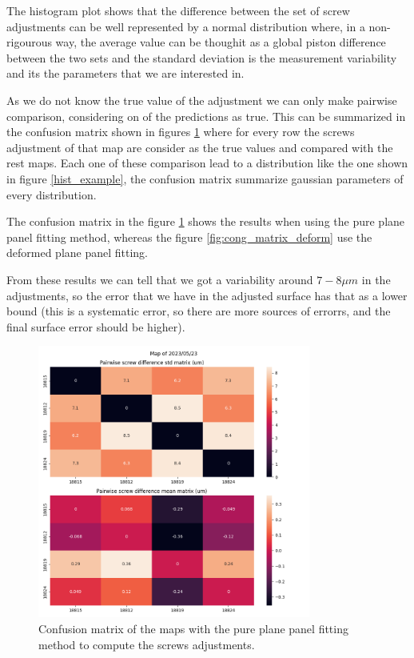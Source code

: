 The histogram plot shows that the difference between the set of screw adjustments can be well represented by a normal distribution where, in a non-rigourous way, the average value can be thoughit as a global piston difference between the two sets and the standard deviation is the measurement variability and its the parameters that we are interested in.

As we do not know the true value of the adjustment we can only make pairwise comparison, considering on of the predictions as true. This can be summarized in the confusion matrix shown in figures \ref{fig:conf_matrix_plane} where for every row the screws adjustment of that map are consider as the true values and compared with the rest maps. Each one of these comparison lead to a distribution like the one shown in figure \ref{hist_example}, the confusion matrix summarize gaussian parameters of every distribution.


The confusion matrix in the figure \ref{fig:conf_matrix_plane} shows the results when using the pure plane panel fitting method, whereas the figure \ref{fig:cong_matrix_deform} use the deformed plane panel fitting.

From these results we can tell that we got a variability around $7-8\mu m$ in the adjustments, so the error that we have in the adjusted surface has that as a lower bound (this is a systematic error, so there are more sources of errorrs, and the final surface error should be higher).


\begin{figure}
    \centering
    \includegraphics[width=0.8\textwidth]{images/20230523_mat_panelfit_plane.png}
    \caption{Confusion matrix of the maps with the pure plane panel fitting method to compute the screws adjustments.}
    \label{fig:conf_matrix_plane}
\end{figure}

